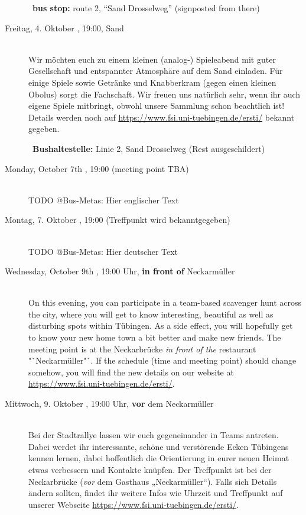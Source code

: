 \begin{description}
	~\textbf{bus stop:} route 2, "`Sand Drosselweg"' (signposted from there)
\else 
	\item[Freitag, 4. Oktober \YEAR, 19:00, Sand]\ \\
	Wir möchten euch zu einem kleinen (analog-) Spieleabend mit guter Gesellschaft und entspannter Atmosphäre auf dem Sand einladen. Für einige Spiele sowie Getränke und Knabberkram (gegen einen kleinen Obolus) sorgt die Fachschaft. Wir freuen uns natürlich sehr, wenn ihr auch eigene Spiele mitbringt, obwohl unsere Sammlung schon beachtlich ist! Details werden noch auf \url{https://www.fsi.uni-tuebingen.de/ersti/} bekannt gegeben.
	
	~\textbf{Bushaltestelle:} Linie 2, Sand Drosselweg (Rest ausgeschildert)
\fi 

\ifml 
	\item[Monday, October 7th \YEAR, 19:00 (meeting point TBA)]\ \\
	TODO @Bus-Metas: Hier englischer Text
\else
	\item[Montag, 7. Oktober \YEAR, 19:00 (Treffpunkt wird bekanntgegeben)]\ \\
	TODO @Bus-Metas: Hier deutscher Text
	
\fi 

\ifml 
	\item[Wednesday, October 9th \YEAR, 19:00 Uhr, \textbf{in front of} Neckarmüller ]\ \\
	On this evening, you can participate in a team-based scavenger hunt across the city, where you will get to know interesting, beautiful as well as disturbing spots within Tübingen. As a side effect, you will hopefully get to know your new home town a bit better and make new friends. The meeting point is at the Neckarbrücke \emph{in front of the} restaurant "`Neckarmüller"`.
	If the schedule (time and meeting point) should change somehow, you will find the new details on our website at \url{https://www.fsi.uni-tuebingen.de/ersti/}.
\else
	 \item[Mittwoch, 9. Oktober \YEAR, 19:00 Uhr, \textbf{vor} dem Neckarmüller ]\ \\
	 Bei der Stadtrallye lassen wir euch gegeneinander in Teams antreten. Dabei werdet ihr interessante, schöne und verstörende Ecken Tübingens kennen lernen, dabei hoffentlich die Orientierung in eurer neuen Heimat etwas verbessern und Kontakte knüpfen. Der Treffpunkt ist bei der Neckarbrücke (\emph{vor} dem Gasthaus „Neckarmüller“).
	 Falls sich Details ändern sollten, findet ihr weitere Infos wie Uhrzeit und Treffpunkt auf unserer Webseite \url{https://www.fsi.uni-tuebingen.de/ersti/}.
\fi 


\end{description}

